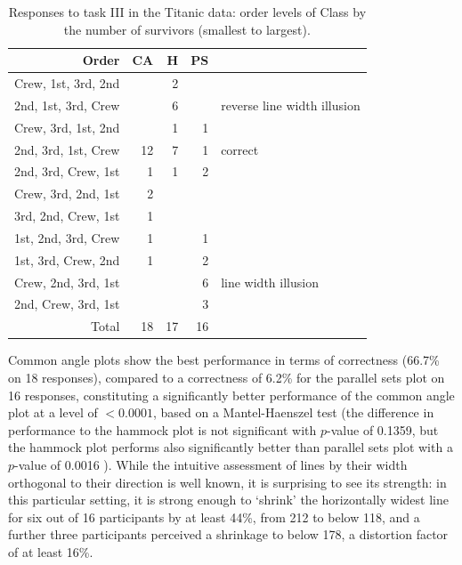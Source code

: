 \documentclass[journal]{vgtc}\usepackage{graphicx, color}
\begin{document}
\begin{table}[ht]
\begin{center}
\begin{tabular}{rrrrl}\hline
Order  & CA & H & PS\\
  \hline
  Crew, 1st, 3rd, 2nd &  &  2 &  \\ \rowcolor{LightGrey}
  2nd, 1st, 3rd, Crew &  &  6 &  & reverse line width illusion \\ 
   Crew, 3rd, 1st, 2nd &  &  1 &  1 \\ \rowcolor{LightGrey}
  2nd, 3rd, 1st, Crew & 12 & 7 & 1 & correct\\  
  2nd, 3rd, Crew, 1st & 1 &  1 &  2 \\
  Crew, 3rd, 2nd, 1st &  2 &  &  \\ 
  3rd, 2nd, Crew, 1st &  1 &  &  \\ 
  1st, 2nd, 3rd, Crew &  1 &  &  1 \\ 
  1st, 3rd, Crew, 2nd &  1 &  &  2 \\ \rowcolor{LightGrey}
  Crew, 2nd, 3rd, 1st &  &  & 6 &  line width illusion\\  
  2nd, Crew, 3rd, 1st &  &  &  3 \\ 
   \hline
  Total & 18 & 17 & 16 \\ 
   \hline
\end{tabular}
\end{center}
\caption{\label{a2} Responses to task III in the Titanic data: order levels of Class by the number of survivors (smallest to largest). }
\end{table}

%
Common angle plots show the best performance in terms of correctness (66.7\% on 18 responses), compared to a correctness of 6.2\% for the parallel sets plot on 16 responses, constituting a significantly better performance of the  common angle plot at a level of $< 0.0001$, based on a Mantel-Haenszel test (the difference in performance to the hammock plot is not significant with $p$-value of 0.1359, but the hammock plot performs also significantly better than parallel sets plot with a $p$-value of 0.0016 ).
While the intuitive assessment of lines by their width orthogonal to their direction is well known, it is surprising to see its strength: in this particular setting, it is strong enough to `shrink' the horizontally widest line for six out of 16 participants by at least  44\%, from 212 to below 118, and a further three participants perceived a  shrinkage to below 178,  a distortion factor of at least 16\%.
\end{document}
